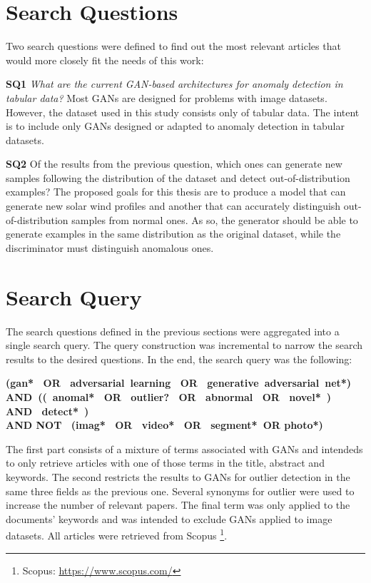 \section{Search Questions}\label{sec:search_questions}
Two search questions were defined to find out the most relevant articles that would more closely fit the needs of this work:


\noindent\textbf{SQ1} \textit{What are the current GAN-based architectures for anomaly detection in tabular data?} Most GANs are designed for problems with image datasets. However, the dataset used in this study consists only of tabular data. The intent is to include only GANs designed or adapted to anomaly detection in tabular datasets.

\noindent\textbf{SQ2} Of the results from the previous question, which ones can generate new samples following the distribution of the dataset and detect out-of-distribution examples? The proposed goals for this thesis are to produce a model that can generate new solar wind profiles and another that can accurately distinguish out-of-distribution samples from normal ones. As so, the generator should be able to generate examples in the same distribution as the original dataset, while the discriminator must distinguish anomalous ones.

\section{Search Query}\label{sec:search_queries}
The search questions defined in the previous sections were aggregated into a single search query. The query construction was incremental to narrow the search results to the desired questions. In the end, the search query was the following:
\begin{center}
\textbf{(gan*  OR  adversarial learning  OR  generative adversarial net*) \\ AND (( anomal*  OR  outlier?  OR  abnormal  OR  novel* )  AND  detect* ) \\ AND NOT  (imag*  OR  video*  OR  segment* OR photo*)}
\end{center}

The first part consists of a mixture of terms associated with GANs and intendeds to only retrieve articles with one of those terms in the title, abstract and keywords. The second restricts the results to GANs for outlier detection in the same three fields as the previous one. Several synonyms for outlier were used to increase the number of relevant papers. The final term was only applied to the documents' keywords and was intended to exclude GANs applied to image datasets. All articles were retrieved from Scopus \footnote{Scopus: \url{https://www.scopus.com/}}.

